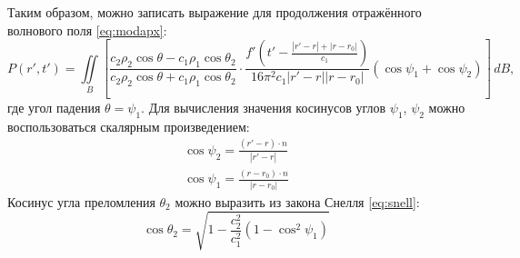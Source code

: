 \documentclass[a4paper, fontsize=14pt]{article}
\begin{document}
	Таким образом, можно записать выражение для продолжения отражённого волнового поля \eqref{eq:modapx}:
	\begin{equation}
		P(r',t') = \iint\limits_{B} \left[ \frac{c_2 \rho_2 \cos \theta - c_1 \rho_1 \cos \theta_2}{c_2 \rho_2 \cos \theta + c_1 \rho_1 \cos \theta_2} \cdot \frac{f'\left(t'-\frac{|r'-r|+|r-r_0|}{c_1}\right) }{16\pi^2c_1|r'-r||r-r_0|} (\cos \psi_1 + \cos \psi_2) \right] \,dB,
	\end{equation}
	где угол падения $\theta=\psi_1$.
	Для вычисления значения косинусов углов $\psi_1$, $\psi_2$ можно воспользоваться скалярным произведением:
	\begin{gather}
		\cos \psi_2=\frac{(r'-r)\cdot n }{|r'-r|} \\
		\cos \psi_1 = \frac{(r-r_0)\cdot n }{|r-r_0|}  \label{eq:cosincident}
	\end{gather}
	Косинус угла преломления $\theta_2$ можно выразить из закона Снелля \eqref{eq:snell}:
	\begin{equation}
		\cos \theta_2 =  \sqrt{1-\frac{c_2^2}{c_1^2}(1-\cos^2 \psi_1)}
	\end{equation}
\end{document}
